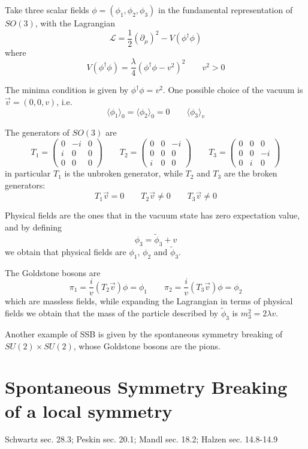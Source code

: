 \documentclass[TheoreticalPhy_ModB.tex]{subfiles}
\begin{document}
\begin{example}[$SO(3)\to SO(2)$ SSB]

Take three scalar fields $\phi=(\phi_1,\phi_2,\phi_3)$ in the fundamental representation of $SO(3)$, with the Lagrangian
\[\mathcal L=\frac12(\partial_\mu)^2-V(\phi^\dagger\phi)\]
where
\[V(\phi^\dagger\phi)=\frac\lambda4(\phi^\dagger\phi-v^2)^2\qquad v^2>0\]

The minima condition is given by $\phi^\dagger\phi=v^2$. One possible choice of the vacuum is $\vec v=(0,0,v)$, i.e.
\[\langle\phi_1\rangle_0=\langle\phi_2\rangle_0=0\qquad\langle\phi_3\rangle_v\]

The generators of $SO(3)$ are
\[T_1=\left(\begin{array}{ccc}0 & -i & 0 \\i & 0 & 0 \\0 & 0 & 0\end{array}\right)
\qquad
T_2=\left(\begin{array}{ccc}0 & 0 & -i \\0 & 0 & 0 \\i & 0 & 0\end{array}\right)
\qquad
T_3=\left(\begin{array}{ccc}0 & 0 & 0 \\0 & 0 & -i \\0 & i & 0\end{array}\right)
\]
in particular $T_1$ is the unbroken generator, while $T_2$ and $T_3$ are the broken generators:
\[T_1\vec v=0\qquad T_2\vec v\neq0\qquad T_3\vec v\neq0\]

Physical fields are the ones that in the vacuum state has zero expectation value, and by defining
\[\phi_3=\tilde\phi_3+v\]
we obtain that physical fields are $\phi_1$, $\phi_2$ and $\tilde\phi_3$. 

The Goldstone bosons are
\[\pi_1=\frac iv(T_2\vec v)\phi=\phi_1\qquad \pi_2=\frac iv(T_3\vec v)\phi=\phi_2\]
which are massless fields, while expanding the Lagrangian in terms of physical fields we obtain that the mass of the particle described by $\tilde\phi_3$ is $m_3^2=2\lambda v$. 


\end{example}

Another example of SSB is given by the spontaneous symmetry breaking of $SU(2)\times SU(2)$, whose Goldstone bosons are the pions. 

\section{Spontaneous Symmetry Breaking of a local symmetry}
\textsf{Schwartz sec. 28.3; Peskin sec. 20.1; Mandl sec. 18.2; Halzen sec. 14.8-14.9}\\
\end{document}
